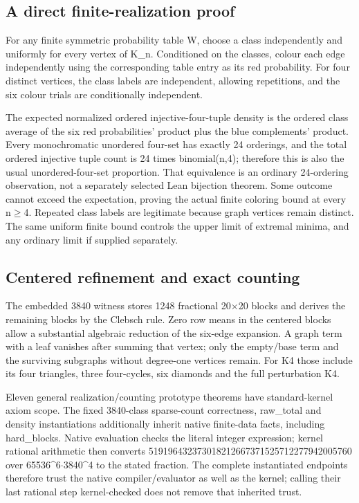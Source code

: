 \documentclass[11pt,a4paper]{article}
\begin{document}
\subsection{A direct finite-realization proof}
For any finite symmetric probability table W, choose a class independently and uniformly for every vertex of K\_n. Conditioned on the classes, colour each edge independently using the corresponding table entry as its red probability. For four distinct vertices, the class labels are independent, allowing repetitions, and the six colour trials are conditionally independent.

The expected normalized ordered injective-four-tuple density is the ordered class average of the six red probabilities' product plus the blue complements' product. Every monochromatic unordered four-set has exactly 24 orderings, and the total ordered injective tuple count is 24 times binomial(n,4); therefore this is also the usual unordered-four-set proportion. That equivalence is an ordinary 24-ordering observation, not a separately selected Lean bijection theorem. Some outcome cannot exceed the expectation, proving the actual finite coloring bound at every n\ensuremath{\geq}4. Repeated class labels are legitimate because graph vertices remain distinct. The same uniform finite bound controls the upper limit of extremal minima, and any ordinary limit if supplied separately.

\subsection{Centered refinement and exact counting}
The embedded 3840 witness stores 1248 fractional 20\ensuremath{\times}20 blocks and derives the remaining blocks by the Clebsch rule. Zero row means in the centered blocks allow a substantial algebraic reduction of the six-edge expansion. A graph term with a leaf vanishes after summing that vertex; only the empty/base term and the surviving subgraphs without degree-one vertices remain. For K4 those include its four triangles, three four-cycles, six diamonds and the full perturbation K4.

Eleven general realization/counting prototype theorems have standard-kernel axiom scope. The fixed 3840-class sparse-count correctness, raw\_total and density instantiations additionally inherit native finite-data facts, including hard\_blocks. Native evaluation checks the literal integer expression; kernel rational arithmetic then converts 519196432373018212667371525712277942005760 over 65536\textasciicircum{}6\ensuremath{\cdot}3840\textasciicircum{}4 to the stated fraction. The complete instantiated endpoints therefore trust the native compiler/evaluator as well as the kernel; calling their last rational step kernel-checked does not remove that inherited trust.
\end{document}
